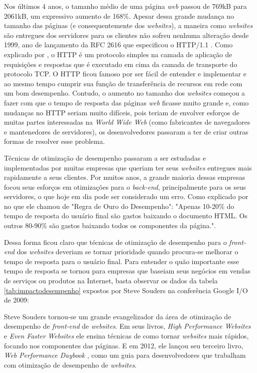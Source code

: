 Nos últimos 4 anos, o tamanho médio de uma página \textit{web} passou de 769kB para 2061kB, um expressivo aumento de 168\%. Apesar dessa grande mudança no tamanho das páginas (e consequentemente dos \textit{websites}), a maneira como \textit{websites} são entregues dos servidores para os clientes não sofreu nenhuma alteração desde 1999, ano de lançamento da RFC 2616 que especificou o HTTP/1.1 \cite{RFC2616}. Como explicado por \cite{Tanenbaum}, o HTTP é um protocolo simples na camada de aplicação de requisições e respostas que é executado em cima da camada de transporte do protocolo TCP. O HTTP ficou famoso por ser fácil de entender e implementar e ao mesmo tempo cumprir sua função de transferência de recursos em rede com um bom desempenho. Contudo, o aumento no tamanho dos \textit{websites} começou a fazer com que o tempo de resposta das páginas \textit{web} ficasse muito grande e, como mudanças no HTTP seriam muito difíceis, pois teriam de envolver esforços de muitas partes interessadas na \textit{World Wide Web} (como fabricantes de navegadores e mantenedores de servidores), os desenvolvedores passaram a ter de criar outras formas de resolver esse problema.

Técnicas de otimização de desempenho passaram a ser estudadas e implementadas por muitas empresas que queriam ter seus \textit{websites} entregues mais rapidamente a seus clientes. Por muitos anos, a grande maioria dessas empresas focou seus esforços em otimizações para o \textit{back-end}, principalmente para os seus servidores, o que hoje em dia pode ser considerado um erro. Como explicado por \cite[p.~35]{HighPerformance} no que ele chamou de "Regra de Ouro do Desempenho": "Apenas 10-20\% do tempo de resposta do usuário final são gastos baixando o documento HTML. Os outros 80-90\% são gastos baixando todos os componentes da página.".

Dessa forma ficou claro que técnicas de otimização de desempenho para o \textit{front-end} dos \textit{websites} deveriam se tornar prioridade quando procura-se melhorar o tempo de resposta para o usuário final. Para entender o quão importante esse tempo de resposta se tornou para empresas que baseiam seus negócios em vendas de serviços ou produtos na Internet, basta observar os dados da tabela \autoref{tab:impactodesempenho} expostos por Steve Souders na conferência Google I/O de 2009:



Steve Souders tornou-se um grande evangelizador da área de otimização de desempenho de \textit{front-end} de \textit{websites}. Em seus livros, \textit{High Performance Websites} \cite{HighPerformance} e \textit{Even Faster Websites} \cite{EvenFaster} ele ensina técnicas de como tornar \textit{websites} mais rápidos, focando nos componentes das páginas. E em 2012, ele lançou seu terceiro livro, \textit{Web Performance Daybook} \cite{WebPerformance}, como um guia para desenvolvedores que trabalham com otimização de desempenho de \textit{websites}.


